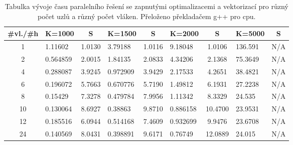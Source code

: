 \documentclass[a4paper,11pt]{article}
\begin{document}
          \begin{table}[ht]
  \begin{center}
   \begin{tabular}{|c|l|c|l|c|l|c|l|c|}
    \hline 
    \#vl./\#h & K=1000 & S & K=1500 & S & K=2000 & S & K=5000 & S \\
   \hline 
   \hline 
   1 & 1.11602 & 1.0130 & 3.79188 & 1.0116 & 9.18048 & 1.0106 & 136.591 & N/A\\
   \hline
    2 & 0.564859 & 2.0015 & 1.84135 & 2.0833 & 4.34206 & 2.1368 & 75.3649 & N/A\\
   \hline
    4 & 0.288087 & 3.9245 & 0.972909 & 3.9429 & 2.17533 & 4.2651 & 38.4821 & N/A\\
   \hline
    6 & 0.196072 & 5.7663 & 0.670776 & 5.7190 & 1.49812 & 6.1931 & 27.2238 & N/A\\
   \hline
    8 & 0.15429 & 7.3278 & 0.479784 & 7.9956 & 1.11342 & 8.3329 & 24.535 & N/A\\
      \hline
    10 & 0.130064 & 8.6927 & 0.38863 & 9.8710 & 0.886158 & 10.4700 & 23.9531 & N/A\\ 
      \hline
    12 & 0.185516 & 6.0944 & 0.514168 & 7.4609 & 0.932699 & 9.9476 & 23.6708 & N/A\\
      \hline
    24 & 0.140569 & 8.0431 & 0.398891 & 9.6171 & 0.76749 & 12.0889 & 24.015 & N/A\\
   \hline    
    \end{tabular}
   \caption{Tabulka vývoje času paralelního řešení se zapnutými optimalizacemi a vektorizací pro různý počet uzlů a různý počet vláken. Přeloženo 
   překladačem g++ pro cpu.} 
   \label{tab.tab16}
  \end{center}   
  \end{table}
  
\end{document}
